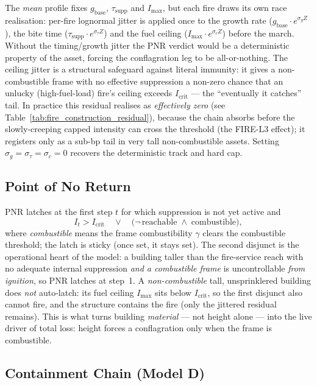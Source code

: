 \documentclass[11pt,a4paper]{article}
\begin{document}
The \emph{mean} profile fixes $g_{\text{base}}$, $\tau_{\text{supp}}$ and
$I_{\max}$, but each fire draws its own race realisation: per-fire lognormal
jitter is applied once to the growth rate
($g_{\text{base}}\!\cdot\!e^{\sigma_g Z}$), the bite time
($\tau_{\text{supp}}\!\cdot\!e^{\sigma_\tau Z}$) and the fuel ceiling
($I_{\max}\!\cdot\!e^{\sigma_c Z}$) before the march. Without the timing/growth
jitter the PNR verdict would be a deterministic property of the asset, forcing
the conflagration leg to be all-or-nothing. The ceiling jitter is a structural
safeguard against literal immunity: it gives a non-combustible frame with no
effective suppression a non-zero chance that an unlucky (high-fuel-load) fire's
ceiling exceeds $I_{\text{crit}}$ --- the ``eventually it catches'' tail. In
practice this residual realises as \emph{effectively zero} (see
Table~\ref{tab:fire_construction_residual}), because the chain absorbs before the
slowly-creeping capped intensity can cross the threshold (the FIRE-L3 effect);
it registers only as a sub-bp tail in very tall non-combustible assets. Setting
$\sigma_g=\sigma_\tau=\sigma_c=0$ recovers the deterministic track and hard cap.

\subsection{Point of No Return}

PNR latches at the first step $t$ for which suppression is not yet active and
\[
I_t > I_{\text{crit}} \quad\lor\quad
\big(\neg\,\text{reachable} \;\land\; \text{combustible}\big),
\]
where \emph{combustible} means the frame combustibility $\gamma$ clears the
combustible threshold; the latch is sticky (once set, it stays set). The second
disjunct is the operational heart of the model: a building taller than the
fire-service reach with no adequate internal suppression \emph{and a combustible
frame} is uncontrollable \emph{from ignition}, so PNR latches at step~1. A
\emph{non-combustible} tall, unsprinklered building does \emph{not} auto-latch:
its fuel ceiling $I_{\max}$ sits below $I_{\text{crit}}$, so the first disjunct
also cannot fire, and the structure contains the fire (only the jittered residual
remains). This is what turns building \emph{material} --- not height alone ---
into the live driver of total loss: height forces a conflagration only when the
frame is combustible.

\subsection{Containment Chain (Model D)}
\end{document}
